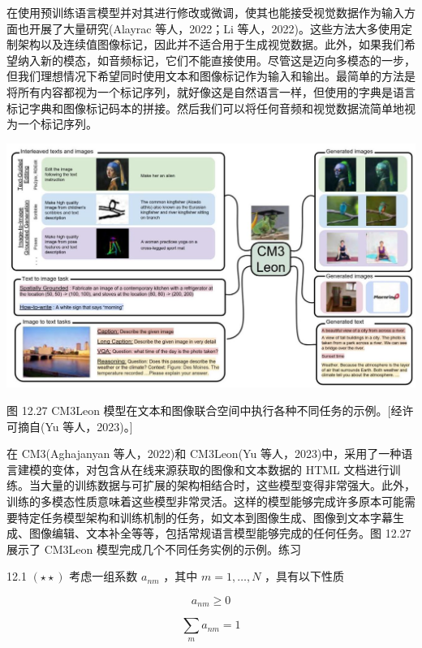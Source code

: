 \documentclass[10pt]{article}
\begin{document}
在使用预训练语言模型并对其进行修改或微调，使其也能接受视觉数据作为输入方面也开展了大量研究(Alayrac 等人，2022；Li 等人，2022)。这些方法大多使用定制架构以及连续值图像标记，因此并不适合用于生成视觉数据。此外，如果我们希望纳入新的模态，如音频标记，它们不能直接使用。尽管这是迈向多模态的一步，但我们理想情况下希望同时使用文本和图像标记作为输入和输出。最简单的方法是将所有内容都视为一个标记序列，就好像这是自然语言一样，但使用的字典是语言标记字典和图像标记码本的拼接。然后我们可以将任何音频和视觉数据流简单地视为一个标记序列。

\begin{center}
\includegraphics[max width=1.0\textwidth]{images/0194e279-9b28-703a-88f4-c3ac21e2010d_422_227_373_1335_797_0.jpg}
\end{center}
\hspace*{3em} 

图 12.27 CM3Leon 模型在文本和图像联合空间中执行各种不同任务的示例。[经许可摘自(Yu 等人，2023)。]

在 CM3(Aghajanyan 等人，2022)和 CM3Leon(Yu 等人，2023)中，采用了一种语言建模的变体，对包含从在线来源获取的图像和文本数据的 HTML 文档进行训练。当大量的训练数据与可扩展的架构相结合时，这些模型变得非常强大。此外，训练的多模态性质意味着这些模型非常灵活。这样的模型能够完成许多原本可能需要特定任务模型架构和训练机制的任务，如文本到图像生成、图像到文本字幕生成、图像编辑、文本补全等等，包括常规语言模型能够完成的任何任务。图 12.27 展示了 CM3Leon 模型完成几个不同任务实例的示例。练习

12.1 \(\left( {\star  \star  }\right)\) 考虑一组系数 \({a}_{nm}\) ，其中 \(m = 1,\ldots ,N\) ，具有以下性质

\[
{a}_{nm} \geq  0 \tag{12.39}
\]

\[
\mathop{\sum }\limits_{m}{a}_{nm} = 1 \tag{12.40}
\]
\end{document}
